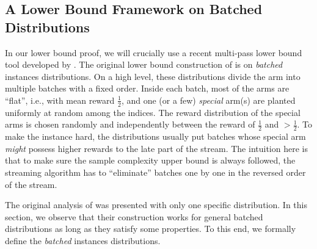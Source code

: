 \subsection{A Lower Bound Framework on Batched Distributions}

In our lower bound proof, we will crucially use a recent multi-pass lower bound tool developed by \cite{AW23BestArm}. The original lower bound construction of \cite{AW23BestArm} is on \emph{batched} instances distributions. On a high level, these distributions divide the arm into multiple batches with a fixed order. Inside each batch, most of the arms are ``flat'', i.e., with mean reward $\frac{1}{2}$, and one (or a few) \emph{special} arm(s) are planted uniformly at random among the indices. The reward distribution of the special arms is chosen randomly and independently between the reward of $\frac{1}{2}$ and $>\frac{1}{2}$. To make the instance hard, the distributions usually put batches whose special arm \emph{might} possess higher rewards to the late part of the stream. The intuition here is that to make sure the sample complexity upper bound is always followed, the streaming algorithm has to ``eliminate'' batches one by one in the reversed order of the stream.

The original analysis of \cite{AW23BestArm} was presented with only one specific distribution. In this section, we observe that their construction works for general batched distributions as long as they satisfy some properties. To this end, we formally define the \emph{batched} instances distributions.


